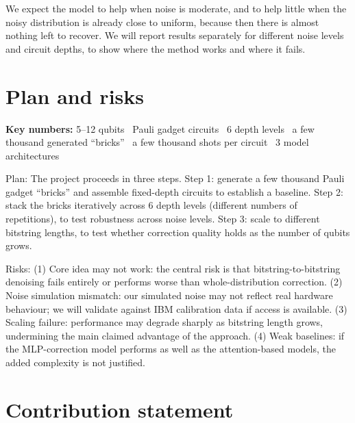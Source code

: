 \documentclass[english]{ucuproposal}
\begin{document}
We expect the model to help when noise is moderate, and to help little when the noisy
distribution is already close to uniform, because then there is almost nothing left to
recover. We will report results separately for different noise levels and circuit
depths, to show where the method works and where it fails.

\section{Plan and risks}
\begin{keyfacts}
\textbf{Key numbers:} 5–12 qubits \textperiodcentered\ Pauli gadget circuits \textperiodcentered\ 6 depth levels \textperiodcentered\ a few thousand generated ``bricks'' \textperiodcentered\ a few thousand shots per circuit \textperiodcentered\ 3 model architectures
\end{keyfacts}

Plan: The project proceeds in three steps. Step 1: generate a few thousand Pauli gadget ``bricks'' and assemble fixed-depth circuits to establish a baseline. Step 2: stack the bricks iteratively across 6 depth levels (different numbers of repetitions), to test robustness across noise levels. Step 3: scale to different bitstring lengths, to test whether correction quality holds as the number of qubits grows.

Risks: (1) Core idea may not work: the central risk is that bitstring-to-bitstring denoising fails entirely or performs worse than whole-distribution correction. (2) Noise simulation mismatch: our simulated noise may not reflect real hardware behaviour; we will validate against IBM calibration data if access is available. (3) Scaling failure: performance may degrade sharply as bitstring length grows, undermining the main claimed advantage of the approach. (4) Weak baselines: if the MLP-correction model performs as well as the attention-based models, the added complexity is not justified.


\section{Contribution statement}
\begin{contributions}
\end{contributions}


\ucuprintbibliography
\end{document}
